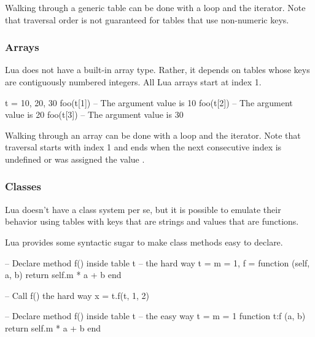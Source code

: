 Walking through a generic table can be done with a  loop and the
 iterator.  Note that traversal order is not guaranteed for tables
that use non-numeric keys.

\subsubsection{Arrays}

Lua does not have a built-in array type.  Rather, it depends on tables whose
keys are contiguously numbered integers.  All Lua arrays start at index 1.

\begin{LuaCode}
t = { 10, 20, 30 }
foo(t[1]) -- The argument value is 10
foo(t[2]) -- The argument value is 20
foo(t[3]) -- The argument value is 30
\end{LuaCode}

Walking through an array can be done with a  loop and the
 iterator.  Note that traversal starts with index 1 and ends when
the next consecutive index is undefined or was assigned the value
.

\subsubsection{Classes}

Lua doesn't have a class system per se, but it is possible to emulate their
behavior using tables with keys that are strings and values that are functions.

Lua provides some syntactic sugar to make class methods easy to declare.

\begin{lrbox}{\LeftBoxA}
\begin{NestedLuaCode}[linewidth=2.5in]
-- Declare method f() inside table t
-- the hard way
t = {
	m = 1,
	f = function (self, a, b)
		return self.m * a + b
	end
}
\end{NestedLuaCode}
\end{lrbox}

\begin{lrbox}{\LeftBoxB}
\begin{NestedLuaCode}[linewidth=2.5in]
-- Call f() the hard way
x = t.f(t, 1, 2)
\end{NestedLuaCode}
\end{lrbox}

\begin{lrbox}{\RightBoxA}
\begin{NestedLuaCode}[linewidth=2.5in]
-- Declare method f() inside table t
-- the easy way
t = {
	m = 1
}
function t:f (a, b)
	return self.m * a + b
end
\end{NestedLuaCode}
\end{lrbox}

